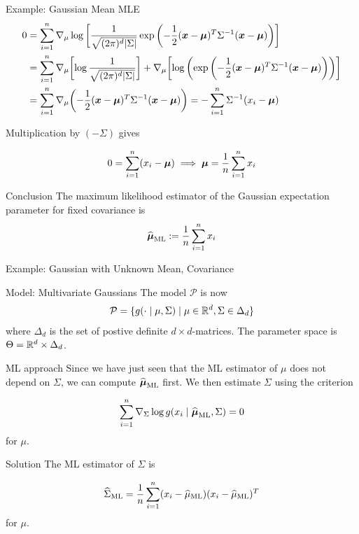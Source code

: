 \documentclass[10pt]{beamer}
\begin{document}
\begin{frame}{Example: Gaussian Mean MLE}
\footnotesize
\begin{align*}
0 &= \displaystyle\sum_{i=1}^n  \nabla_\mu  \log \bigg[ {\displaystyle\frac{1}{\sqrt{(2 \pi)^d |\Sigma| }} \exp \bigg( { - \displaystyle\frac{1}{2} ({\boldsymbol x} - {\boldsymbol \mu})^T \Sigma^{-1} ( {\boldsymbol x} - {\boldsymbol \mu})} \bigg)} \bigg]   \\
&=  \displaystyle\sum_{i=1}^n   \nabla_\mu  \bigg[ {\log \displaystyle\frac{1}{\sqrt{(2 \pi)^d |\Sigma| }}} \bigg] +\nabla_\mu \bigg[ { \log \bigg( {\exp \bigg( { - \displaystyle\frac{1}{2} ({\boldsymbol x} - {\boldsymbol \mu})^T \Sigma^{-1} ( {\boldsymbol x} - {\boldsymbol \mu})} \bigg) } \bigg)} \bigg] \\
&=  \displaystyle\sum_{i=1}^n \nabla_\mu \bigg( { - \displaystyle\frac{1}{2} ({\boldsymbol x} - {\boldsymbol \mu})^T \Sigma^{-1} ( {\boldsymbol x} - {\boldsymbol \mu})} \bigg)  = -  \displaystyle\sum_{i=1}^n \Sigma^{-1} (x_i - {\boldsymbol \mu}) 
\end{align*}

Multiplication by $(- \Sigma)$ gives

\[  0 = \displaystyle\sum_{i=1}^n (x_i - {\boldsymbol \mu}) \implies {\boldsymbol \mu} = \displaystyle\frac{1}{n} \displaystyle\sum_{i=1}^n x_i\]

\begin{sblock}{Conclusion}
The maximum likelihood estimator of the Gaussian expectation parameter for fixed covariance is 
\[ \widehat{{\boldsymbol \mu}}_{\text{ML}} := \displaystyle\frac{1}{n} \displaystyle\sum_{i=1}^n x_i \]
\end{sblock}

\end{frame}


\begin{frame}{Example: Gaussian with Unknown Mean, Covariance}
\footnotesize
\begin{sblock}{Model: Multivariate Gaussians}
The model $\mathcal{P}$ is now
\[ \mathcal{P} = \{ {g(\cdot \; | \; \mu, \Sigma) \; | \; \mu \in \mathbb{R}^d, \Sigma \in \Delta_d} \} \]
where $\Delta_d$ is the set of postive definite $d \times d$-matrices. The parameter space is $\Theta = \mathbb{R}^d \times \Delta_d$.
\end{sblock}

\begin{sblock}{ML approach}
Since we have just seen that the ML estimator of $\mu$ does not depend on $\Sigma$, we can compute $\widehat{{\boldsymbol \mu}}_\text{ML}$ first. We then estimate $\Sigma$ using the criterion

\[ \displaystyle\sum_{i=1}^n \nabla_\Sigma \log g(x_i \; | \; \widehat{{\boldsymbol \mu}}_\text{ML}, \Sigma) = 0 \]
for $\mu$.
\end{sblock}

\begin{sblock}{Solution}
The ML estimator of $\Sigma$ is 

\[  \widehat{\Sigma}_\text{ML} = \displaystyle\frac{1}{n} \displaystyle\sum_{i=1}^n (x_i -  \widehat{\mu}_\text{ML}) (x_i - \widehat{\mu}_\text{ML})^T \]
for $\mu$.
\end{sblock}

\end{frame}
\end{document}
